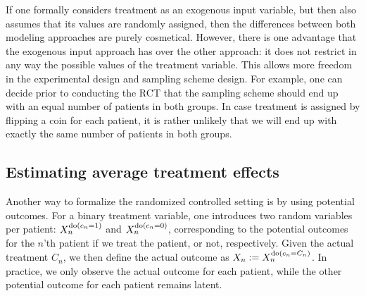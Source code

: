 If one formally considers treatment as an exogenous input variable, but then also assumes 
that its values are randomly assigned, then the differences between both modeling approaches
are purely cosmetical. However, there is one advantage that the exogenous input approach has over the 
other approach: it does not restrict in any way the possible values of the treatment variable. 
This allows more freedom in the experimental design and sampling scheme design. 
For example, one can decide prior to conducting the RCT that 
the sampling scheme should end up with an equal number of patients in both groups. 
In case treatment is assigned by flipping a coin for each patient, it is rather unlikely
that we will end up with exactly the same number of patients in both groups. 


\subsection{Estimating average treatment effects}

Another way to formalize the randomized controlled setting is by using potential outcomes.
For a binary treatment variable, one introduces two random variables per patient:
$X^{\operatorname{do}(c_n=1)}_n$ and $X^{\operatorname{do}(c_n=0)}_n$, corresponding to the potential outcomes for
the $n$'th patient if we treat the patient, or not, respectively. 
Given the actual treatment $C_n$, we then define the actual outcome as 
$X_n := X_n^{\operatorname{do}(c_n=C_n)}$. In practice, we only observe the actual outcome for
each patient, while the other potential outcome for each patient remains latent. 

